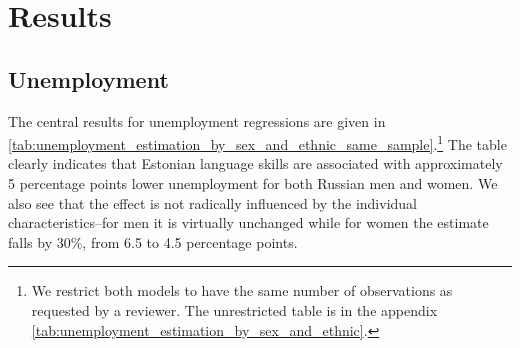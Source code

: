 \documentclass[12pt, a4paper]{article}
\begin{document}
\section{Results}
\label{sec:results}
\subsection{Unemployment}
\label{subsec:basic_model_unemployment}

The central results for unemployment regressions are given in
\cref{tab:unemployment_estimation_by_sex_and_ethnic_same_sample}.\footnote{We
  restrict both models to have the same number of observations as
  requested by a reviewer. The unrestricted table is in the appendix \cref{tab:unemployment_estimation_by_sex_and_ethnic}.}
The
table clearly indicates that Estonian language skills are associated
with approximately 5 percentage points lower unemployment for both
Russian men and women. We also see that the effect is not radically
influenced by the individual characteristics--for men it is
virtually unchanged while for women the estimate falls by 30\%, from
6.5 to 4.5 percentage points.
\end{document}
